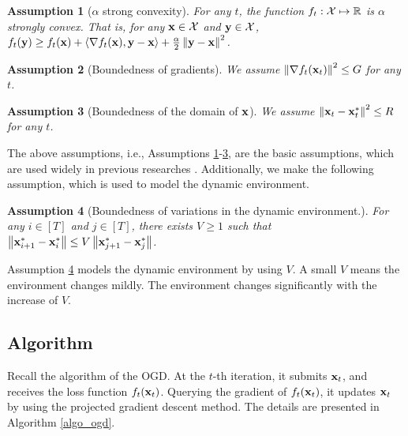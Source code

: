 \documentclass[journal]{IEEEtran}
\newtheorem{Assumption}{\bf{Assumption}}
\begin{document}
\begin{Assumption}[$\alpha$ strong convexity]
\label{assumption_f_t_strongly_convex}
For any $t$, the function $f_t: {\mathcal{X}}\mapsto \mathbb{R}$ is $\alpha $ strongly convex. That is, for any ${\bf x}\in{\mathcal{X}}$ and ${\bf y}\in{\mathcal{X}}$, $f_t({\bf y})\ge f_t({\bf x})+\left\langle\nabla f_t({\bf x}), {\bf y}-{\bf x} \right\rangle + \frac{\alpha}{2}\left\lVert{\bf y} - {\bf x}\right\rVert^2$.
\end{Assumption}



\begin{Assumption}[Boundedness of gradients]
\label{assumption_bounded_gradient}
We assume  $\left\lVert\nabla f_t({\bf x}_t)\right\rVert^2 \le G$ for any $t$.
\end{Assumption}
\begin{Assumption}[Boundedness of the domain of ${\bf x}$]
\label{assumption_bounded_distance_x}
We assume  $\left\lVert{\bf x}_t - {\bf x}_t^{\ast}\right\rVert^2\le R$ for any $t$.
\end{Assumption}

The above assumptions, i.e., Assumptions \ref{assumption_f_t_strongly_convex}-\ref{assumption_bounded_distance_x}, are the basic assumptions, which are used widely in previous researches \cite{ShalevShwartz:2012dz,Hazan2016Introduction,Duchi:2011,Zinkevich:2003}. Additionally, we make the following assumption, which is used to model the dynamic environment.

\begin{Assumption}[Boundedness of variations in the dynamic environment.]
\label{assumption_bounded_variation}
For any $i\in[T]$ and $j\in[T]$,  there exists $V\ge 1$ such that $\left\lVert{\bf x}_{i+1}^{\ast} - {\bf x}_i^{\ast}\right\rVert \le V \left\lVert{\bf x}_{j+1}^{\ast} - {\bf x}_j^{\ast}\right\rVert $.
\end{Assumption} 

Assumption \ref{assumption_bounded_variation} models the dynamic environment by using $V$. A small $V$ means the environment changes mildly. The environment changes significantly with the increase of $V$. 




\subsection{Algorithm}
Recall the algorithm of the OGD. At the $t$-th iteration, it submits ${\bf x}_t$, and receives the loss function $f_t({\bf x}_t)$. Querying the gradient of $f_t({\bf x}_t)$, it updates ${\bf x}_t$ by using the projected gradient descent method. The details are presented in Algorithm \ref{algo_ogd}. 
\end{document}
